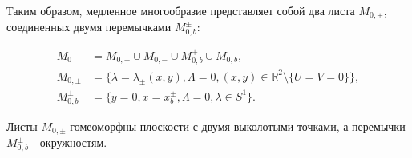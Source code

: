 Таким образом, медленное многообразие представляет собой два листа $M_{0,\pm}$, соединенных двумя перемычками $M_{0,b}^{\pm}$:

\begin{align*}
M_0 &= M_{0,+} \cup M_{0,-} \cup M_{0,b}^{+} \cup M_{0,b}^{-}, \\
M_{0,\pm} &= \{ \lambda = \lambda_{\pm}(x,y), \Lambda = 0, (x,y) \in \mathbb{R}^2 \setminus \{U=V=0\} \}, \\
M_{0,b}^{\pm} &= \{ y=0, x=x_b^{\pm}, \Lambda=0, \lambda\in S^1 \}.
\end{align*}

Листы $M_{0,\pm}$ гомеоморфны плоскости с двумя выколотыми точками, а перемычки $M_{0,b}^{\pm}$ - окружностям.
